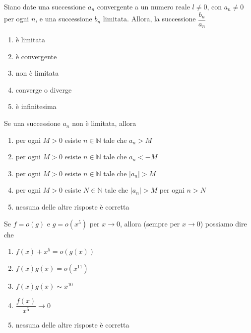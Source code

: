 \begin{quiz}
Siano date una successione $a_n$ convergente a un numero reale $l\neq0$, con $a_n\neq0$ per ogni $n$, e una successione $b_n$ limitata. Allora, la successione $\dfrac{b_n}{a_n}$
\begin{enumerate}
\item \`e limitata
\item \`e convergente
\item non \`e limitata
\item converge o diverge
\item \`e infinitesima
\end{enumerate}
\end{quiz}

\begin{quiz}
Se una successione $a_n$ non \`e limitata, allora
\begin{enumerate}
\item per ogni $M>0$ esiste $n\in\mathbb N$ tale che $a_n>M$
\item per ogni $M>0$ esiste $n\in\mathbb N$ tale che $a_n<-M$
\item per ogni $M>0$ esiste $n\in\mathbb N$ tale che $|a_n|>M$
\item per ogni $M>0$ esiste $N\in\mathbb N$ tale che $|a_n|>M$ per ogni $n>N$
\item nessuna delle altre risposte \`e corretta
\end{enumerate}
\end{quiz}

\begin{quiz}
Se $f=o(g)$ e $g=o(x^5)$ per $x\to0$, allora (sempre per $x\to0$) possiamo dire che
\begin{enumerate}
\item $f(x)+x^5=o(g(x))$
\item $f(x)g(x)=o(x^{11})$
\item $f(x)g(x)\sim x^{10}$
\item $\dfrac{f(x)}{x^5}\to0$
\item nessuna delle altre risposte \`e corretta
\end{enumerate}
\end{quiz}

